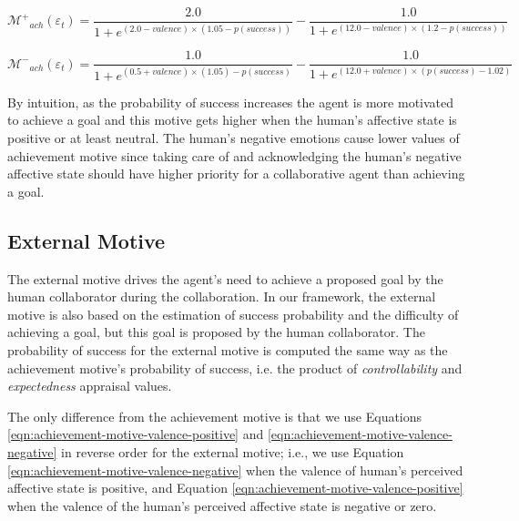 \documentclass[12pt]{report}
\begin{document}
\begin{equation}
\mathcal{M^{+}}_{ach}(\varepsilon_t)=
\frac{2.0}{1+e^{(2.0-valence)\times(1.05-p(success))}}
- \frac{1.0}{1+e^{(12.0-valence)\times(1.2-p(success))}}
\label{eqn:achievement-motive-valence-positive}
\end{equation}

\begin{equation}
\mathcal{M^{-}}_{ach}(\varepsilon_t)=
\frac{1.0}{1+e^{(0.5+valence)\times(1.05)-p(success)}}
- \frac{1.0}{1+e^{(12.0+valence)\times(p(success)-1.02)}}
\label{eqn:achievement-motive-valence-negative}
\end{equation}

By intuition, as the probability of success increases the agent is more
motivated to achieve a goal and this motive gets higher when the human's
affective state is positive or at least neutral. The human's negative emotions cause
lower values of achievement motive since taking care of and acknowledging the
human's negative affective state should have higher priority for a collaborative agent
than achieving a goal.

\subsection{External Motive}
The external motive drives the agent's need to achieve a proposed goal by the
human collaborator during the collaboration. In our framework, the external
motive is also based on the estimation of success probability and the difficulty
of achieving a goal, but this goal is proposed by the human collaborator. The
probability of success for the external motive is computed the same way as the
achievement motive's probability of success, i.e. the product of
\textit{controllability} and \textit{expectedness} appraisal values.

The only difference from the achievement motive is that we use Equations
\ref{eqn:achievement-motive-valence-positive} and
\ref{eqn:achievement-motive-valence-negative} in reverse order for the external
motive; i.e., we use Equation \ref{eqn:achievement-motive-valence-negative}
when the valence of human's perceived affective state is positive, and Equation
\ref{eqn:achievement-motive-valence-positive} when the valence of the human's
perceived affective state is negative or zero.
\end{document}
